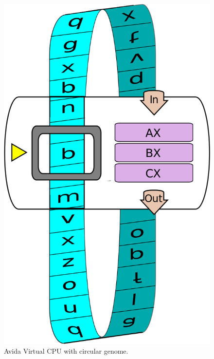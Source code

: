 \begin{figure}[h!]
\begin{center}
\includegraphics[width=0.27999999999999997\columnwidth]{figures/squishedCPU/squishedCPU}
\caption{Avida Virtual CPU with circular genome.%
}
\end{center}
\end{figure}